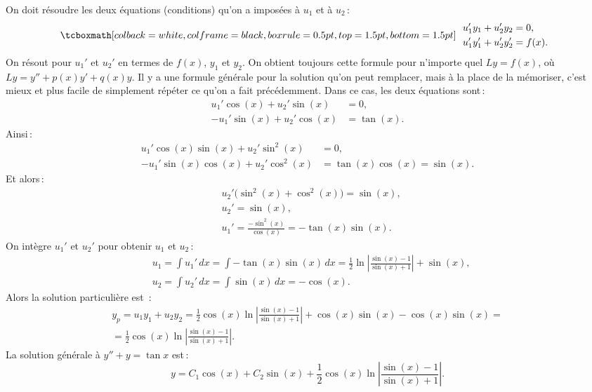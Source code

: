 On doit résoudre les deux équations (conditions) qu'on a imposées à  $u_1$ et à $u_2$\,:
\begin{equation*}
\mybxbg{~~
\begin{aligned}
& u_1' y_1 + u_2' y_2 = 0 ,\\
& u_1' y_1' + u_2' y_2' = f(x) .
\end{aligned}
~~}
\end{equation*}
On résout pour $u_1'$ et $u_2'$ en termes de $f(x)$, $y_1$ et $y_2$.
On obtient toujours cette formule pour n'importe quel $Ly = f(x)$, où $Ly =
y''+p(x)y'+q(x)y$.  Il y a une formule générale pour la solution qu'on peut remplacer, mais à la place de la mémoriser, c'est mieux et plus facile de simplement répéter ce qu'on a fait précédemment. Dans ce cas, les deux équations sont\,:  
\begin{align*}
u_1' \cos (x) + u_2' \sin (x) &= 0 ,\\
-u_1' \sin (x) + u_2' \cos (x) &= \tan (x) .
\end{align*}
Ainsi\,: 
\begin{align*}
u_1' \cos (x) \sin (x) + u_2' \sin^2 (x) & = 0 ,\\
-u_1' \sin (x) \cos (x) + u_2' \cos^2 (x) & = \tan (x) \cos (x) = \sin (x) .
\end{align*}
Et alors\,: 
\begin{align*}
& u_2' \bigl(\sin^2 (x) + \cos^2 (x)\bigr) = \sin (x) , \\
& u_2' = \sin (x) , \\
& u_1' = \frac{- \sin^2 (x)}{\cos (x)} = - \tan (x) \sin (x) .
\end{align*}
On intègre $u_1'$ et $u_2'$ pour obtenir $u_1$ et $u_2$\,: 
\begin{align*}
& u_1 = \int u_1'\,dx 
= \int - \tan (x) \sin (x)\,dx
= \frac{1}{2}
\ln \left\lvert \frac{\sin (x)-1}{\sin (x) + 1} \right\rvert
+ \sin (x) , \\
& u_2 = \int u_2'\,dx 
= \int \sin (x)\,dx = -\cos (x) .
\end{align*}
Alors la solution particulière est \,: 
\begin{multline*}
y_p = u_1 y_1 + u_2 y_2 =
\frac{1}{2} \cos (x) \ln \left\lvert \frac{\sin (x)-1}{\sin (x) + 1}
\right\rvert
+ \cos (x) \sin (x)
-\cos (x) \sin (x)
= \\ =
\frac{1}{2} \cos (x) \ln \left\lvert \frac{\sin (x)-1}{\sin (x) + 1}
\right\rvert .
\end{multline*}
La solution générale à  $y'' + y = \tan x$ est\,: 
\begin{equation*}
y = C_1 \cos (x) + C_2 \sin (x) +
\frac{1}{2} \cos (x) \ln \left\lvert \frac{\sin (x)-1}{\sin (x) + 1}
\right\rvert .
\end{equation*}

